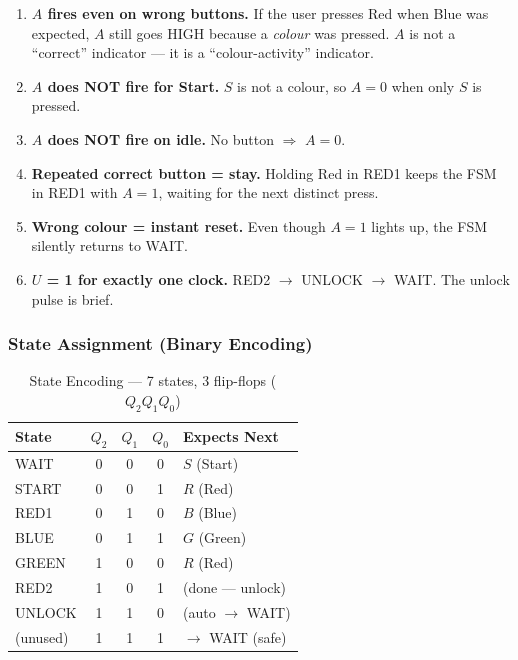 \documentclass[12pt,a4paper]{article}
\begin{document}
\begin{importantbox}
\begin{enumerate}
  \item \textbf{$A$ fires even on wrong buttons.} If the user presses Red when Blue was expected, $A$ still goes HIGH because a \emph{colour} was pressed. $A$ is not a ``correct'' indicator --- it is a ``colour-activity'' indicator.
  \item \textbf{$A$ does NOT fire for Start.} $S$ is not a colour, so $A=0$ when only $S$ is pressed.
  \item \textbf{$A$ does NOT fire on idle.} No button $\Rightarrow$ $A=0$.
  \item \textbf{Repeated correct button = stay.} Holding Red in RED1 keeps the FSM in RED1 with $A=1$, waiting for the next distinct press.
  \item \textbf{Wrong colour = instant reset.} Even though $A=1$ lights up, the FSM silently returns to WAIT.
  \item \textbf{$U$ = 1 for exactly one clock.} RED2 $\to$ UNLOCK $\to$ WAIT. The unlock pulse is brief.
\end{enumerate}
\end{importantbox}

\subsubsection{State Assignment (Binary Encoding)}

\begin{table}[H]
\centering
\caption{State Encoding --- 7 states, 3 flip-flops ($Q_2 Q_1 Q_0$)}
\begin{tabular}{l|ccc|l}
\toprule
\textbf{State} & $Q_2$ & $Q_1$ & $Q_0$ & \textbf{Expects Next} \\
\midrule
WAIT    & 0 & 0 & 0 & $S$ (Start) \\
START   & 0 & 0 & 1 & $R$ (Red) \\
RED1    & 0 & 1 & 0 & $B$ (Blue) \\
BLUE    & 0 & 1 & 1 & $G$ (Green) \\
GREEN   & 1 & 0 & 0 & $R$ (Red) \\
RED2    & 1 & 0 & 1 & (done --- unlock) \\
UNLOCK  & 1 & 1 & 0 & (auto $\to$ WAIT) \\
(unused)& 1 & 1 & 1 & $\to$ WAIT (safe) \\
\bottomrule
\end{tabular}
\end{table}
\end{document}
